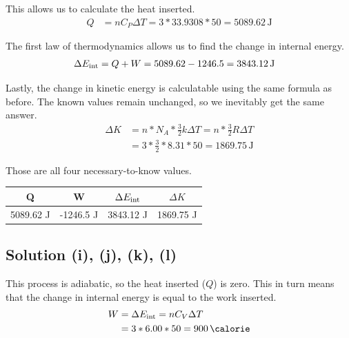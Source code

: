 \documentclass[12pt]{article}
\begin{document}
            This allows us to calculate the heat inserted.
            \begin{align}
                Q   &=  n C_P \Delta T
                    =   3 * 33.9308 * 50
                    =   5089.62\,\unit{\joule}
            \end{align}

            The first law of thermodynamics allows us to find the change in internal energy.
            \begin{align}
                \Delta E_{\rm int}  &=  Q + W
                    =   5089.62 - 1246.5
                    =   3843.12\,\unit{\joule}
            \end{align}

            Lastly, the change in kinetic energy is calculatable using the same formula as before.
            The known values remain unchanged, so we inevitably get the same answer.
            \begin{align}
                \Delta K    &=  n * N_A * \frac{3}{2}k \Delta T
                    =   n * \frac{3}{2}R \Delta T\\
                    &=  3 * \frac{3}{2} * 8.31 * 50
                    =   1869.75\,\unit{\joule}
            \end{align}

            Those are all four necessary-to-know values.

            \begin{center}
                \begin{tabular}{c | c | c | c}
                    Q   &   W   &   $\Delta E_{\rm int}$    &   $\Delta K$\\
                    \hline
                    5089.62 \unit{\joule} & -1246.5 \unit{\joule} & 3843.12 \unit{\joule} & 1869.75 \unit{\joule}
                \end{tabular}
            \end{center}

        \subsection{Solution (i), (j), (k), (l)}
            This process is adiabatic, so the heat inserted ($Q$) is zero.
            This in turn means that the change in internal energy is equal to the work inserted.
            \begin{align}
                W   &=  \Delta E_{\rm int}
                    =   nC_V \Delta T\\
                    &=  3 * 6.00 * 50
                    =   900\,\unit{\calorie}
            \end{align}
\end{document}
